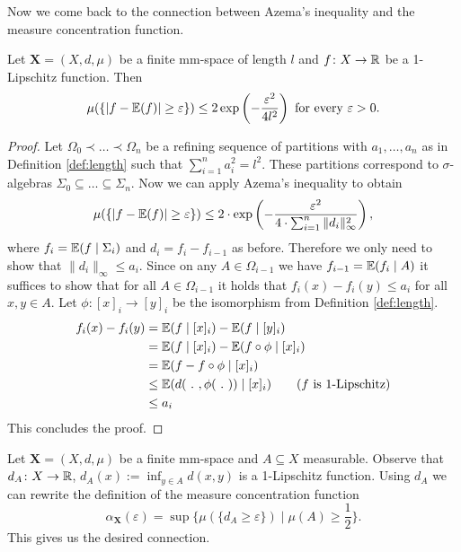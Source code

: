 Now we come back to the connection between Azema's inequality and the measure concentration function.
		
\begin{lemma}\label{lem:lipschitz}
	Let $\boldsymbol{X}=(X,d,\mu)$ be a finite mm-space of length $l$ and $f\colon X\to\mathbb{R}$ be a 1-Lipschitz function. Then
	\[\mu(\{|f-\mathbb{E}(f)|\geq\varepsilon\})\leq 2\exp\left(-\frac{\varepsilon^2}{4l^2}\right)\text{ for every $\varepsilon>0$.}\] 
\end{lemma}
\begin{proof}
	Let 
	$\Omega_0\prec\dots\prec\Omega_n$
	be a refining sequence of partitions with $a_1,\dots,a_n$ as in Definition \ref{def:length} such that $\sum_{i=1}^{n}a_i^2=l^2$. These partitions correspond to $\sigma$-algebras $\Sigma_0\subseteq\dots\subseteq\Sigma_n$. Now we can apply Azema's inequality to obtain
	\[\mu(\{|f-\mathbb{E}(f)|\geq \varepsilon\})\leq 2\cdot\exp\left(-\frac{\varepsilon^2}{4\cdot\sum_{i=1}^{n}\|d_i\|^2_\infty}\right),\]
	where $f_i=\mathbb{E}(f\mid \Sigma_i)$ and $d_i=f_i-f_{i-1}$ as before. Therefore we only need to show that $\|d_i\|_\infty\leq a_i$. Since on any $A\in\Omega_{i-1}$ we have $f_{i-1}=\mathbb{E}(f_i\mid A)$ it suffices to show that for all $A\in\Omega_{i-1}$ it holds that $f_i(x)-f_i(y)\leq a_i$ for all $x,y\in A$.
	Let $\phi\colon [x]_i\to [y]_i$ be the isomorphism from Definition \ref{def:length}.
	\begin{align*}
		f_i(x)-f_i(y) & =\mathbb{E}(f\mid [x]_i)-\mathbb{E}(f\mid [y]_i)                                \\
		              & =\mathbb{E}(f\mid [x]_i)-\mathbb{E}(f\circ\phi\mid [x]_i)                       \\
		              & =\mathbb{E}(f-f\circ\phi\mid [x]_i)                                     \\
		              & \leq \mathbb{E}(d(\ .\ ,\phi(\ .\ ))\mid [x]_i)\tag{$f$ is 1-Lipschitz} \\
		              & \leq a_i                                                        
	\end{align*}
	This concludes the proof.
\end{proof}
		
Let $\boldsymbol{X}=(X,d,\mu)$ be a finite mm-space and $A\subseteq X$ measurable. Observe that $d_A\colon X\to\mathbb{R}$, $d_A(x):=\inf_{y\in A}d(x,y)$ is a 1-Lipschitz function. Using $d_A$ we can rewrite the definition of the measure concentration function 
\[\alpha_{\boldsymbol{X}}(\varepsilon)=\sup\{\mu(\{d_A\geq\varepsilon\})\mid \mu(A)\geq\frac{1}{2}\}.\]
This gives us the desired connection.
		
